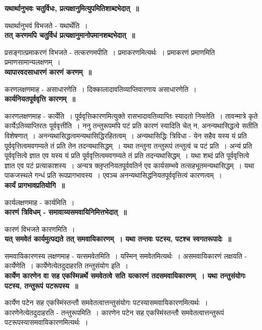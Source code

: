 {\bfseries यथार्थानुभवः चतुर्विधः, प्रत्यक्षानुमित्युपमितिशाब्दभेदात्~॥}\par
	यथार्थानुभवं विभजते - यथार्थेति~।\\[10pt]
{\bfseries तत् करणमपि चतुर्विधं प्रत्यक्षानुमानोपमानशब्दभेदात्~॥}\par
	प्रसङ्गात्प्रमाकरणं विभजते - तत्करणमपीति~। प्रमाकरणमित्यर्थः~। प्रमाकरणं प्रमाणमिति प्रमाणसामान्यलक्षणम्~।\\[10pt]
{\bfseries व्यापारवदसाधारणं कारणं करणम्~॥}\par
	करणलक्षणमाह - असाधारणेति~। दिक्कालादावतिव्याप्तिवारणाय असाधारणेति~।\\[10pt]
{\bfseries कार्यनियतपूर्ववृत्ति कारणम्~॥}\par
	कारणलक्षणमाह - कार्येति~। पूर्ववृत्तिकारणमित्युक्ते रासभादावतिव्याप्तिः स्यादतो नियतेति~। तावन्मात्रे कृते कार्येऽतिव्याप्तिरतः पूर्ववृत्तीति~। ननु तन्तुरूपमपि पटं प्रति कारणं स्यादिति चेत् न, अनन्यथासिद्धत्वे सतीति विशेषणात्~। अनन्यथासिद्धत्वमन्यथासिद्धिरहितत्वम्~। अन्यथासिद्धिः त्रिविधा - येन सहैव यस्य यं प्रति पूर्ववृत्तित्वमवगम्यते तं प्रति तेन तदन्यथासिद्धम्~। यथा तन्तुना तन्तुरूपं तन्तुत्वं च पटं प्रति~। अन्यं प्रति पूर्ववृत्तित्वे ज्ञात एव यस्य यं प्रति पूर्ववृत्तित्वमवगम्यते तं प्रति तदन्यथासिद्धम्~। यथा शब्दं प्रति पूर्ववृत्तित्वे ज्ञात एव पटं प्रत्याकाशस्य~। अन्यत्र क्लृप्तनियतपूर्ववतिर्न एव कार्यसम्भवे तत्सहभूतमन्यथासिद्धम्~। यथा पाकजस्थले गन्धं प्रति रूपप्रागभावस्य~। एवञ्च अनन्यथासिद्धनियतपूर्ववृत्तित्वं कारणत्वम्~।\\[10pt]
{\bfseries कार्यं प्रागभावप्रतियोगि~॥}\par
	कार्यलक्षणमाह - कार्यमिति~।\\[10pt]
{\bfseries कारणं त्रिविधम् - समावाय्यसमवायिनिमित्तभेदात्~॥}\par
	कारणं विभजते कारणमिति~।\\[10pt]
{\bfseries यत् समवेतं कार्यमुत्पद्यते तत् समवायिकारणम्~। यथा तन्तवः पटस्य, पटश्च स्वगत\-रूपादेः~॥}\par
	समवायिकारणस्य लक्षणमाह - यत्समवेतमिति~। यस्मिन् समवेतमित्यर्थः~। असमवायिकारणं लक्षयति - कार्येणेति~। कार्येणेत्येतदुदाहरति तन्तुसंयोग इति~।\\[10pt]
{\bfseries कार्येण कारणेन वा सह एकस्मिन्नर्थे समवेतत्वे सति यत्कारणं तदसमवायिकारणम्~। यथा तन्तुसंयोगः पटस्य, तन्तुरूपं पटरूपस्य~॥}\par
	कार्येण पटेन सह एकस्मिंस्तन्तौ समवेतत्वात्तन्तुसंयोगः पटस्यासमवायिकारणमित्यर्थः~। कारणेनेत्येतदुदाहरति - तन्तुरूपमिति~। कारणेन पटेन सह एकस्मिंस्तन्तौ समवेतत्वात्तन्तुरूपं पटरूपस्यासमवायिकारणमित्यर्थः~।\\[10pt]
